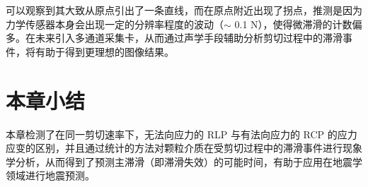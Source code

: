 可以观察到其大致从原点引出了一条直线，而在原点附近出现了拐点，推测是因为力学传感器本身会出现一定的分辨率程度的波动（$\sim$ 0.1 \unit{\newton}），使得微滞滑的计数偏多。在未来引入多通道采集卡，从而通过声学手段辅助分析剪切过程中的滞滑事件，将有助于得到更理想的图像结果。

\section{本章小结}

本章检测了在同一剪切速率下，无法向应力的 RLP 与有法向应力的 RCP 的应力应变的区别，并且通过统计的方法对颗粒介质在受剪切过程中的滞滑事件进行现象学分析，从而得到了预测主滞滑（即滞滑失效）的可能时间，有助于应用在地震学领域进行地震预测。
